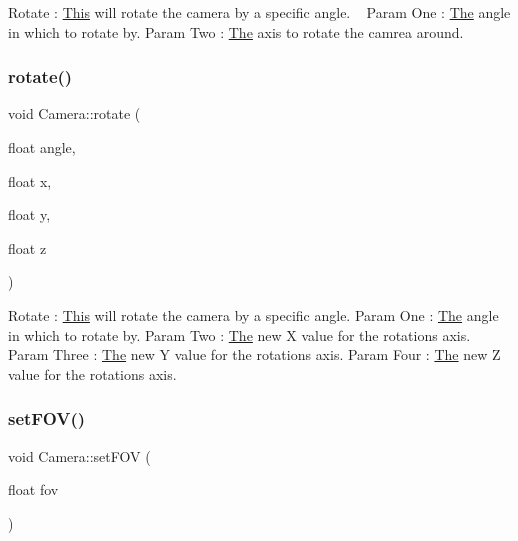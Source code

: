 Rotate \+: \mbox{\hyperlink{class_this}{This}} will rotate the camera by a specific angle. ~\newline
Param One \+: \mbox{\hyperlink{class_the}{The}} angle in which to rotate by. Param Two \+: \mbox{\hyperlink{class_the}{The}} axis to rotate the camrea around. \mbox{\label{class_camera_a4a45040f06f24a53af7f17bbcc610f22}} 
\subsubsection{\texorpdfstring{rotate()}{rotate()}\hspace{0.1cm}{\footnotesize\ttfamily [2/2]}}
{\footnotesize\ttfamily void Camera\+::rotate (\begin{DoxyParamCaption}\item[{float}]{angle,  }\item[{float}]{x,  }\item[{float}]{y,  }\item[{float}]{z }\end{DoxyParamCaption})\hspace{0.3cm}{\ttfamily [inline]}}

Rotate \+: \mbox{\hyperlink{class_this}{This}} will rotate the camera by a specific angle. Param One \+: \mbox{\hyperlink{class_the}{The}} angle in which to rotate by. Param Two \+: \mbox{\hyperlink{class_the}{The}} new X value for the rotation\textquotesingle{}s axis. Param Three \+: \mbox{\hyperlink{class_the}{The}} new Y value for the rotation\textquotesingle{}s axis. Param Four \+: \mbox{\hyperlink{class_the}{The}} new Z value for the rotation\textquotesingle{}s axis. \mbox{\label{class_camera_ade53ee61895c2143da3cec03d08ef3eb}} 
\subsubsection{\texorpdfstring{set\+F\+O\+V()}{setFOV()}}
{\footnotesize\ttfamily void Camera\+::set\+F\+OV (\begin{DoxyParamCaption}\item[{float}]{fov }\end{DoxyParamCaption})\hspace{0.3cm}{\ttfamily [inline]}}

